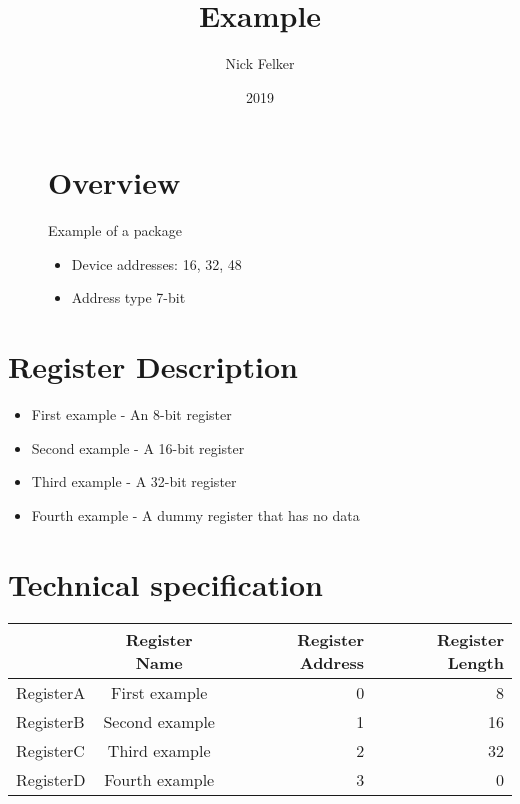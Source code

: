 \documentclass[a4paper,12pt,oneside,pdflatex,italian,final,twocolumn]{article}
\title{ Example }
\author{ Nick Felker }
\date{ 2019 }
\begin{document}
\pagestyle{fancy}



\onecolumn


\begin{figure}
\begin{minipage}{0.47\textwidth}

\section{Overview}
    Example of a package
    \begin{itemize}
        \item Device addresses:
          16,
          32,
          48
        \item Address type 7-bit
    \end{itemize}


\end{minipage}
\hfill

\end{figure}


\section{Register Description}
\begin{itemize}
\item First example - An 8-bit register
\item Second example - A 16-bit register
\item Third example - A 32-bit register
\item Fourth example - A dummy register that has no data
\end{itemize}

\section{Technical specification}
\centering
\begin{tabular}{lcrr}
\toprule
 & Register Name & Register Address & Register Length \\
\midrule
RegisterA & First example & 0 & 8 \\
RegisterB & Second example & 1 & 16 \\
RegisterC & Third example & 2 & 32 \\
RegisterD & Fourth example & 3 & 0 \\
\bottomrule
\end{tabular}
\end{document}
